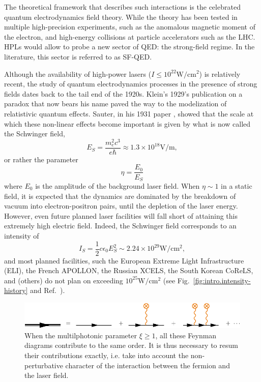 \documentclass[11pt,SymmetricalJury]{inrsthesis/inrsthesis}
\begin{document}
The theoretical framework that describes such interactions is the celebrated
quantum electrodynamics field theory. While the theory has been tested in multiple
high-precision experiments, such as the anomalous magnetic moment of the electron,
and high-energy collisions at particle accelerators such as the LHC. HPLs would
allow to probe a new sector of QED: the strong-field regime. In the literature,
this sector is referred to as SF-QED.


Although the availability of high-power lasers
($I\leq10^{22}\si{\watt\per\cm\squared}$) is relatively recent, the study of
quantum electrodynamics processes in the presence of strong fields dates back to
the tail end of the 1920s. Klein's 1929's publication \cite{Klein1929} on a
paradox that now bears his name paved the way to the modelization of
relatistivic quantum effects. Sauter, in his 1931 paper \cite{Sauter1931},
showed that the scale at which these non-linear effects become important is
given by what is now called the Schwinger field,
  \begin{equation}
    E_S = \frac{m_e^2c^3}{e\hbar} \approx 1.3\times10^{18}\si{\volt\per\meter},
  \end{equation}
or rather the parameter
  \begin{equation}
    \eta = \frac{E_0}{E_S}
  \end{equation}
where $E_0$ is the amplitude of the background laser field. When $\eta\sim1$
in a static field,
it is expected that the dynamics are dominated by the breakdown of vacuum
into electron-positron pairs, until the depletion of the laser energy.
However, even future planned laser facilities will fall short of attaining
this extremely high electric field. Indeed, the Schwinger field corresponds
to an intensity of
  \begin{equation}
    I_S = \frac{1}{2}c\epsilon_0E_S^2\sim 2.24\times10^{29}\si{\watt\per\cm\squared},
  \end{equation}
and most planned facilities, such the European Extreme Light Infrastructure (ELI),
the French APOLLON, the Russian XCELS, the South Korean CoReLS, and (others)
do not plan on exceeding $10^{25}\si{\watt\per\cm\squared}$
(see Fig.~\ref{fig:intro.intensity-history} and Ref.~\citep{Danson2015}).

\begin{figure}
  \centering
  \includegraphics{figs/ResummedPropagator.pdf}
  \caption[Resummation of multiphotonic effects on the fermion propagator.]
          {When the multilphotonic parameter $\xi\geq1$, all these Feynman
          diagrams contribute to the same order. It is thus necessary to
          resum their contributions exactly, i.e. take into account
          the non-perturbative character of the interaction between the
          fermion and the laser field.}
  \label{fig:intro.resummed-propagator}
\end{figure}
\end{document}
